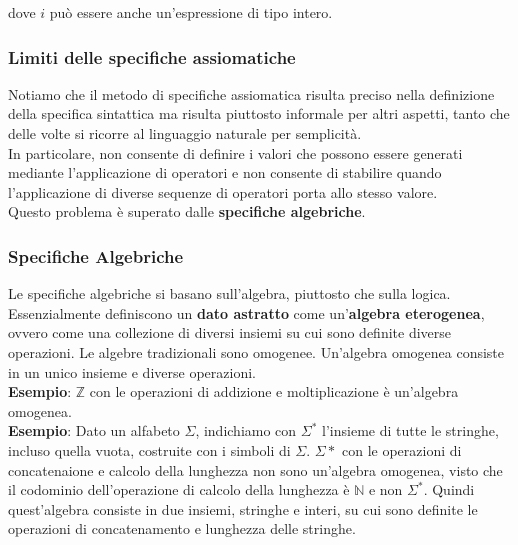 \documentclass{article}
\begin{document}
	dove $i$ può essere anche un'espressione di tipo intero.
	
	\subsubsection{Limiti delle specifiche assiomatiche}
	Notiamo che il metodo di specifiche assiomatica risulta preciso nella definizione della specifica sintattica ma risulta piuttosto informale per altri aspetti, tanto che delle volte si ricorre al linguaggio naturale per semplicità. \\
	In particolare, non consente di definire i valori che possono essere generati mediante l'applicazione di operatori e non consente di stabilire quando l'applicazione di diverse sequenze di operatori porta allo stesso valore.
	\vspace{\baselineskip} \\
	Questo problema è superato dalle \textbf{specifiche algebriche}.
	
	\subsubsection{Specifiche Algebriche}
	Le specifiche algebriche si basano sull'algebra, piuttosto che sulla logica. Essenzialmente definiscono un \textbf{dato astratto} come un'\textbf{algebra eterogenea}, ovvero come una collezione di diversi insiemi su cui sono definite diverse operazioni.
	Le algebre tradizionali sono omogenee. Un'algebra omogenea consiste in un unico insieme e diverse operazioni.
	\vspace{\baselineskip} \\
	\textbf{Esempio}: $\mathbb{Z}$  con le operazioni di addizione e moltiplicazione è un'algebra omogenea.
	\vspace{\baselineskip} \\
	\textbf{Esempio}: Dato un alfabeto $\Sigma$, indichiamo con $\Sigma^\ast $ l'insieme di tutte le stringhe, incluso quella vuota, costruite con i simboli di $\Sigma$.
	$\Sigma\ast $ con le operazioni di concatenaione e calcolo della lunghezza non sono un'algebra omogenea, visto che il codominio dell'operazione di calcolo della lunghezza è $\mathbb{N}$ e non $\Sigma^\ast$.
	Quindi quest'algebra consiste in due insiemi, stringhe e interi, su cui sono definite le operazioni di concatenamento e lunghezza delle stringhe.
	
\end{document}
